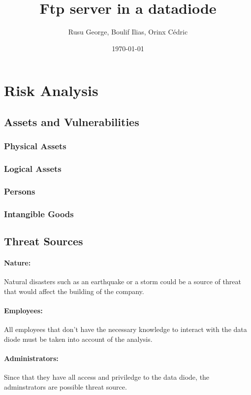 \documentclass[a4paper,10pt]{article}
\title{Ftp server in a datadiode}
\author{Rusu George, Boulif Ilias, Orinx Cédric}
\date{\today}
\begin{document}
\maketitle

\newpage
\section{Risk Analysis}
\subsection{Assets and Vulnerabilities}
\subsubsection{Physical Assets}
\subsubsection{Logical Assets}
\subsubsection{Persons}
\subsubsection{Intangible Goods}

\subsection{Threat Sources}

\paragraph{Nature:} Natural disasters such as an earthquake or a storm could be a source of threat that would affect the building of the company.

\paragraph{Employees:} All employees that don't have the necessary knowledge to interact with the data diode must be taken into account of the analysis.

\paragraph{Administrators:} Since that they have all access and priviledge to the data diode, the adminstrators are possible threat source.
\end{document}
